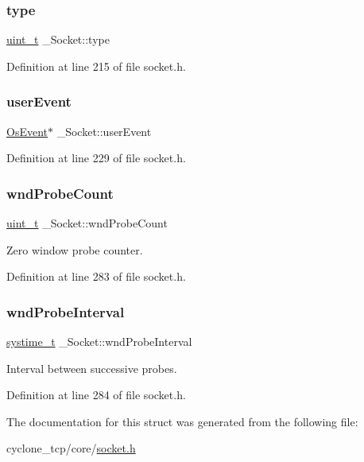 \subsubsection{\texorpdfstring{type}{type}}
{\footnotesize\ttfamily \hyperlink{compiler__port_8h_a12a1e9b3ce141648783a82445d02b58d}{uint\+\_\+t} \+\_\+\+Socket\+::type}



Definition at line 215 of file socket.\+h.

\mbox{\label{struct__Socket_a732611247771fe0f744bb68e14cf9840}} 
\subsubsection{\texorpdfstring{user\+Event}{userEvent}}
{\footnotesize\ttfamily \hyperlink{structOsEvent}{Os\+Event}$\ast$ \+\_\+\+Socket\+::user\+Event}



Definition at line 229 of file socket.\+h.

\mbox{\label{struct__Socket_a5f808c6b2f83f5129178409566dabcb1}} 
\subsubsection{\texorpdfstring{wnd\+Probe\+Count}{wndProbeCount}}
{\footnotesize\ttfamily \hyperlink{compiler__port_8h_a12a1e9b3ce141648783a82445d02b58d}{uint\+\_\+t} \+\_\+\+Socket\+::wnd\+Probe\+Count}



Zero window probe counter. 



Definition at line 283 of file socket.\+h.

\mbox{\label{struct__Socket_af6d14811d5d3fbdee734d5f4ab17d5ac}} 
\subsubsection{\texorpdfstring{wnd\+Probe\+Interval}{wndProbeInterval}}
{\footnotesize\ttfamily \hyperlink{compiler__port_8h_ae3e32a98d431a02106616da3071832dd}{systime\+\_\+t} \+\_\+\+Socket\+::wnd\+Probe\+Interval}



Interval between successive probes. 



Definition at line 284 of file socket.\+h.



The documentation for this struct was generated from the following file\+:\begin{DoxyCompactItemize}
\item 
cyclone\+\_\+tcp/core/\hyperlink{socket_8h}{socket.\+h}\end{DoxyCompactItemize}
